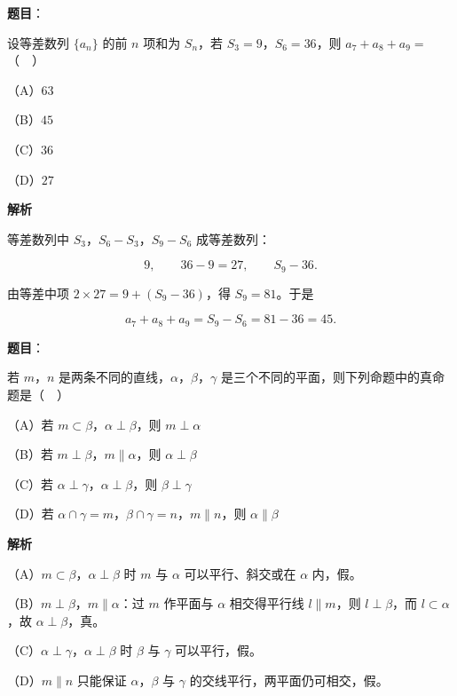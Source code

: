 \begin{answer}

\textbf{题目}：

设等差数列 $\{a_n\}$ 的前 $n$ 项和为 $S_n$，若 $S_3=9$，$S_6=36$，则 $a_7+a_8+a_9=$（　）

（A）$63$

（B）$45$

（C）$36$

（D）$27$

\textbf{解析}

等差数列中 $S_3$，$S_6-S_3$，$S_9-S_6$ 成等差数列：

\nopagebreak[4]
\[9,\qquad 36-9=27,\qquad S_9-36.\]

由等差中项 $2\times27=9+(S_9-36)$，得 $S_9=81$。于是

\nopagebreak[4]
\[a_7+a_8+a_9=S_9-S_6=81-36=45.\]


\end{answer}
\begin{answer}

\textbf{题目}：

若 $m$，$n$ 是两条不同的直线，$\alpha$，$\beta$，$\gamma$ 是三个不同的平面，则下列命题中的真命题是（　）

（A）若 $m\subset\beta$，$\alpha\perp\beta$，则 $m\perp\alpha$

（B）若 $m\perp\beta$，$m\parallel\alpha$，则 $\alpha\perp\beta$

（C）若 $\alpha\perp\gamma$，$\alpha\perp\beta$，则 $\beta\perp\gamma$

（D）若 $\alpha\cap\gamma=m$，$\beta\cap\gamma=n$，$m\parallel n$，则 $\alpha\parallel\beta$

\textbf{解析}

（A）$m\subset\beta$，$\alpha\perp\beta$ 时 $m$ 与 $\alpha$ 可以平行、斜交或在 $\alpha$ 内，假。

（B）$m\perp\beta$，$m\parallel\alpha$：过 $m$ 作平面与 $\alpha$ 相交得平行线 $l\parallel m$，则 $l\perp\beta$，而 $l\subset\alpha$，故 $\alpha\perp\beta$，真。

（C）$\alpha\perp\gamma$，$\alpha\perp\beta$ 时 $\beta$ 与 $\gamma$ 可以平行，假。

（D）$m\parallel n$ 只能保证 $\alpha$，$\beta$ 与 $\gamma$ 的交线平行，两平面仍可相交，假。


\end{answer}
